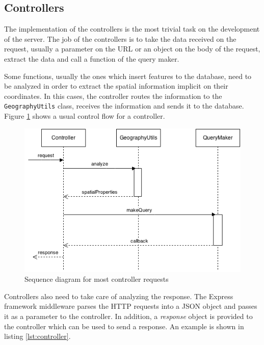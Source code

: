 \subsection{Controllers}

The implementation of the controllers is the most trivial task on the development of the server. The job of the controllers is to take the data received on the request, usually a parameter on the URL or an object on the body of the request, extract the data and call a function of the query maker.

Some functions, usually the ones which insert features to the database, need to be analyzed in order to extract the spatial information implicit on their coordinates. In this cases, the controller routes the information to the \texttt{GeographyUtils} class, receives the information and sends it to the database. Figure \ref{fig:controller-sequence} shows a usual control flow for a controller.

\begin{figure}[ht]
  \centering
  \includegraphics[width=.7\textwidth]{fig/controller-sequence}
  \caption{Sequence diagram for most controller requests}
  \label{fig:controller-sequence}
\end{figure} 

Controllers also need to take care of analyzing the response. The Express framework middleware parses the HTTP requests into a JSON object and passes it as a parameter to the controller. In addition, a \textit{response} object is provided to the controller which can be used to send a response. An example is shown in listing \ref{lst:controller}.

